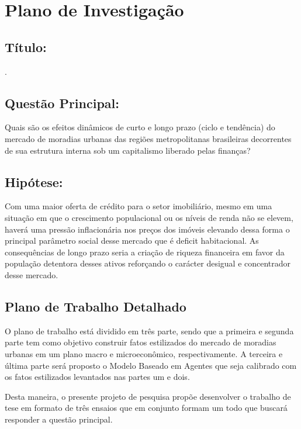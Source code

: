 \section{Plano de Investigação}
\label{sec:plano-invetigação}
\subsection*{Título:}


\MyTitle.
 
\subsection*{Questão Principal:}

Quais são os efeitos dinâmicos de curto e longo prazo (ciclo e tendência) do mercado de moradias urbanas das regiões metropolitanas brasileiras decorrentes de sua estrutura interna sob um capitalismo liberado pelas finanças?

\subsection*{Hipótese:}

Com uma maior oferta de crédito para o setor imobiliário, mesmo em uma situação em que o crescimento populacional ou os níveis de renda não se elevem, haverá uma pressão inflacionária nos preços dos imóveis elevando dessa forma o principal parâmetro social desse mercado que é deficit habitacional. As consequências de longo prazo seria a criação de riqueza financeira em favor da população detentora desses ativos reforçando o carácter desigual e concentrador desse mercado.

\subsection*{Plano de Trabalho Detalhado}

O plano de trabalho está dividido em três parte, sendo que a primeira e segunda parte tem como objetivo construir fatos estilizados do mercado de moradias urbanas em um plano macro e microeconômico, respectivamente. A terceira e última parte será proposto o Modelo Baseado em Agentes que seja calibrado com os fatos estilizados levantados nas partes um e dois.

Desta maneira, o presente projeto de pesquisa propõe desenvolver o trabalho de tese em formato de três ensaios que em conjunto formam um todo que buscará responder a questão principal. 

